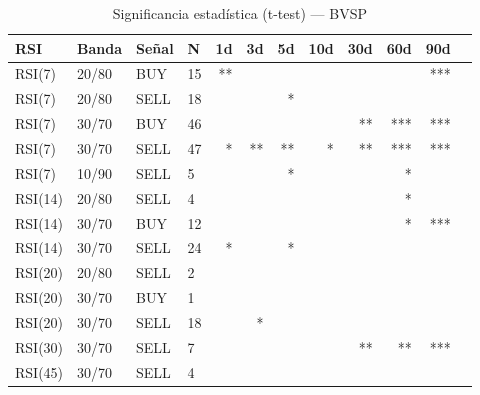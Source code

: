 %
\begin{table}[htbp]
    \centering
    \caption{Significancia estadística (t-test) --- BVSP}
    \label{tab:sig_bvsp}
    \small
    \begin{tabular}{llllrrrrrrrr}
        \toprule
        \textbf{RSI} & \textbf{Banda} & \textbf{Se\~{n}al} & \textbf{N} & \textbf{1d} & \textbf{3d} & \textbf{5d} & \textbf{10d} & \textbf{30d} & \textbf{60d} & \textbf{90d} \\
        \midrule
        RSI(7) & 20/80 & BUY & 15 & ** &  &  &  &  &  & *** \\
        RSI(7) & 20/80 & SELL & 18 &  &  & * &  &  &  &  \\
        RSI(7) & 30/70 & BUY & 46 &  &  &  &  & ** & *** & *** \\
        RSI(7) & 30/70 & SELL & 47 & * & ** & ** & * & ** & *** & *** \\
        RSI(7) & 10/90 & SELL & 5 &  &  & * &  &  & * &  \\
        \midrule
        RSI(14) & 20/80 & SELL & 4 &  &  &  &  &  & * &  \\
        RSI(14) & 30/70 & BUY & 12 &  &  &  &  &  & * & *** \\
        RSI(14) & 30/70 & SELL & 24 & * &  & * &  &  &  &  \\
        \midrule
        RSI(20) & 20/80 & SELL & 2 &  &  &  &  &  &  &  \\
        RSI(20) & 30/70 & BUY & 1 &  &  &  &  &  &  &  \\
        RSI(20) & 30/70 & SELL & 18 &  & * &  &  &  &  &  \\
        \midrule
        RSI(30) & 30/70 & SELL & 7 &  &  &  &  & ** & ** & *** \\
        \midrule
        RSI(45) & 30/70 & SELL & 4 &  &  &  &  &  &  &  \\
        \bottomrule
    \end{tabular}
\end{table}
